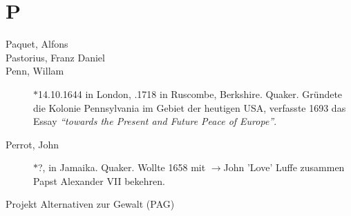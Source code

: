 \section*{P}

\articlesize

\begin{description}

 \item[Paquet, Alfons]

 \item[Pastorius, Franz Daniel]

 \item[Penn, Willam] $\ast$14.10.1644 in London, .1718 in Ruscombe, Berkshire. Quaker. Gründete die Kolonie Pennsylvania im Gebiet der heutigen USA, verfasste 1693 das Essay \textit{"`towards the Present and Future Peace of Europe"'}.

 \item[Perrot, John] $\ast$?,  in Jamaika. Quaker. Wollte 1658 mit $\to$John 'Love' Luffe zusammen Papst Alexander VII bekehren.

 \item[Projekt Alternativen zur Gewalt (PAG)]

 \end{description}
\normalsize


